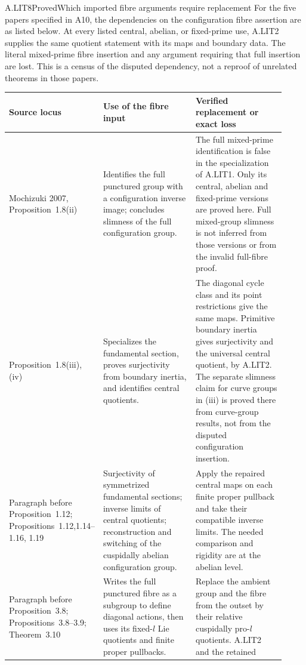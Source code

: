 \begin{claim}{A.LIT8}{Proved}{Which imported fibre arguments require replacement}
For the five papers specified in A10, the dependencies on the
configuration fibre assertion are as listed below. At every
listed central, abelian, or fixed-prime use, A.LIT2 supplies the
same quotient statement with its maps and boundary data. The
literal mixed-prime fibre insertion and any argument requiring
that full insertion are lost. This is a census of the disputed
dependency, not a reproof of unrelated theorems in those papers.
\end{claim}
\begin{center}\small
\begin{longtable}{p{0.23\linewidth}p{0.35\linewidth}p{0.34\linewidth}}
\toprule
Source locus&Use of the fibre input&Verified replacement or exact loss\\\midrule
Mochizuki 2007, Proposition~1.8(ii)&
Identifies the full punctured group with a configuration inverse
image; concludes slimness of the full configuration group.&
The full mixed-prime identification is false in the specialization
of A.LIT1. Only its central, abelian and fixed-prime versions are
proved here. Full mixed-group slimness is not inferred from those
versions or from the invalid full-fibre proof.\\
Proposition~1.8(iii),(iv)&
Specializes the fundamental section, proves surjectivity from
boundary inertia, and identifies central quotients.&
The diagonal cycle class and its point restrictions give the
same maps. Primitive boundary inertia gives surjectivity and
the universal central quotient, by A.LIT2. The separate slimness
claim for curve groups in (iii) is proved there from curve-group
results, not from the disputed configuration insertion.\\
Paragraph before Proposition~1.12; Propositions~1.12,1.14--1.16,
1.19&
Surjectivity of symmetrized fundamental sections; inverse limits
of central quotients; reconstruction and switching of the
cuspidally abelian configuration group.&
Apply the repaired central maps on each finite proper pullback
and take their compatible inverse limits. The needed comparison
and rigidity are at the abelian level.\\
Paragraph before Proposition~3.8; Propositions~3.8--3.9;
Theorem~3.10&
Writes the full punctured fibre as a subgroup to define diagonal
actions, then uses its fixed-$l$ Lie quotients and finite proper
pullbacks.&
Replace the ambient group and the fibre from the outset by their
relative cuspidally pro-$l$ quotients. A.LIT2 and the retained

\end{longtable}
\end{center}
